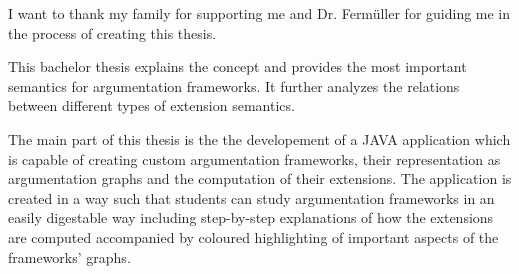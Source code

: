 \documentclass[draft,final]{vutinfth} %
\newcommand{\hl}{\par\vspace{6pt}} %
\begin{document}
\frontmatter %

\addstatementpage

\begin{acknowledgements*}
I want to thank my family for supporting me and Dr. Ferm{\"u}ller for guiding me in the process of creating this thesis.
\end{acknowledgements*}

\begin{abstract*}
This bachelor thesis explains the concept and provides the most important semantics for argumentation frameworks. It further analyzes the relations between different types of extension semantics.\hl %
The main part of this thesis is the the developement of a JAVA application which is capable of creating custom argumentation frameworks, their representation as argumentation graphs and the computation of their extensions. The application is created in a way such that students can study argumentation frameworks in an easily digestable way including step-by-step explanations of how the extensions are computed accompanied by coloured highlighting of important aspects of the frameworks' graphs.\\ %
\end{abstract*}


\tableofcontents* %

\mainmatter
\end{document}
